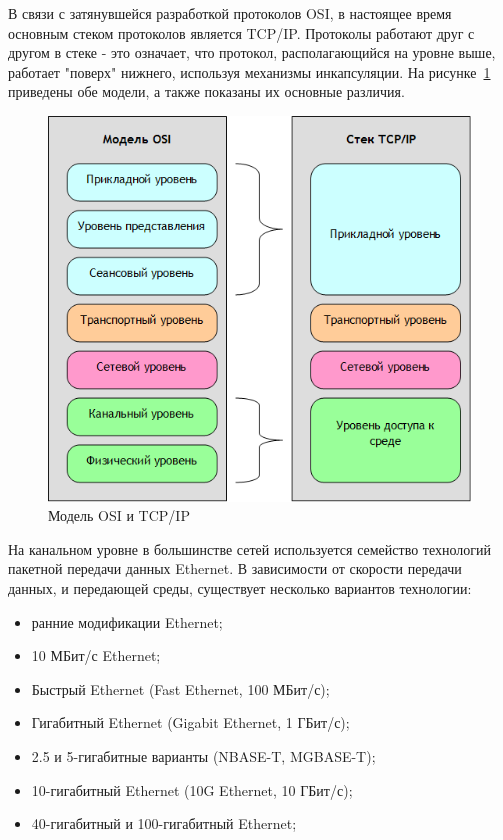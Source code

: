В связи с затянувшейся разработкой протоколов OSI, в настоящее время основным стеком протоколов является TCP/IP. Протоколы работают друг с другом в стеке - это означает, что протокол, располагающийся на уровне выше, работает
"поверх" нижнего, используя механизмы инкапсуляции. На рисунке~\ref{pic:model_osi_vs_tcpip} приведены обе модели, а также показаны их основные различия.
\begin{figure}[h]
\centering
\includegraphics[scale=0.5]{pictures/model_osi_vs_tcpip}
\caption{Модель OSI и TCP/IP}
\label{pic:model_osi_vs_tcpip}
\end{figure}

На канальном уровне в большинстве сетей используется семейство технологий пакетной передачи данных Ethernet. В зависимости от скорости передачи данных, и передающей среды, существует несколько вариантов технологии:
\begin{itemize}
\item ранние модификации Ethernet;
\item 10 МБит/с Ethernet;
\item Быстрый Ethernet (Fast Ethernet, 100 МБит/с);
\item Гигабитный Ethernet (Gigabit Ethernet, 1 ГБит/с);
\item 2.5 и 5-гигабитные варианты (NBASE-T, MGBASE-T);
\item 10-гигабитный Ethernet (10G Ethernet, 10 ГБит/с);
\item 40-гигабитный и 100-гигабитный Ethernet;
\end{itemize}

